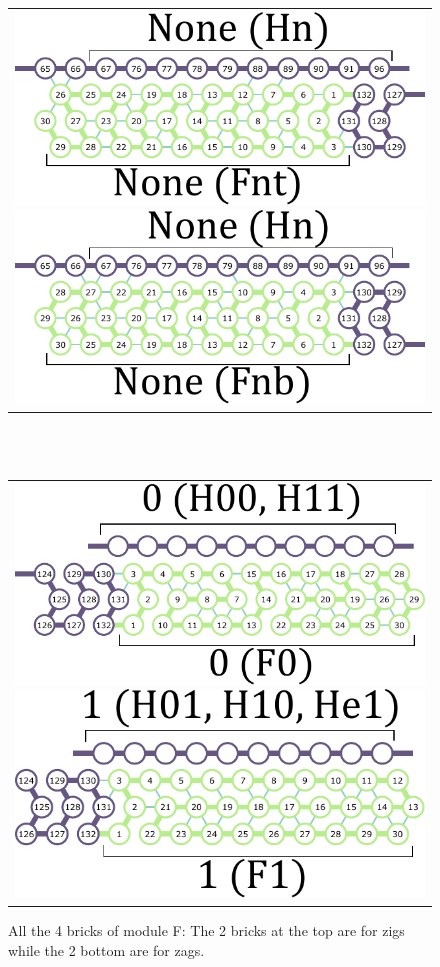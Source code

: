 \documentclass[runningheads]{llncs}
\begin{document}
\begin{figure}[tb]
\begin{tabular}{c}
 \begin{minipage}{0.5\linewidth}
  \centering
   \includegraphics[width=0.6\linewidth]{fig/svg/Fnt_1.pdf}
 \end{minipage}
 
 \begin{minipage}{0.5\linewidth}
  \centering
   \includegraphics[width=0.6\linewidth]{fig/svg/Fnb_1.pdf}

 \end{minipage}
 \end{tabular}
\ \\
\ \\
\begin{tabular}{c}
 \begin{minipage}{0.5\linewidth}
  \centering
   \includegraphics[width=0.6\linewidth]{fig/svg/F0_1.pdf}
 \end{minipage}
 
 \begin{minipage}{0.5\linewidth}
  \centering
   \includegraphics[width=0.6\linewidth]{fig/svg/F1_1.pdf}

 \end{minipage}
 \end{tabular}
 \caption{All the 4 bricks of module F: The 2 bricks at the top are for zigs while the 2 bottom are for zags. }
 \label{fig:formatters}
\end{figure}
\end{document}
